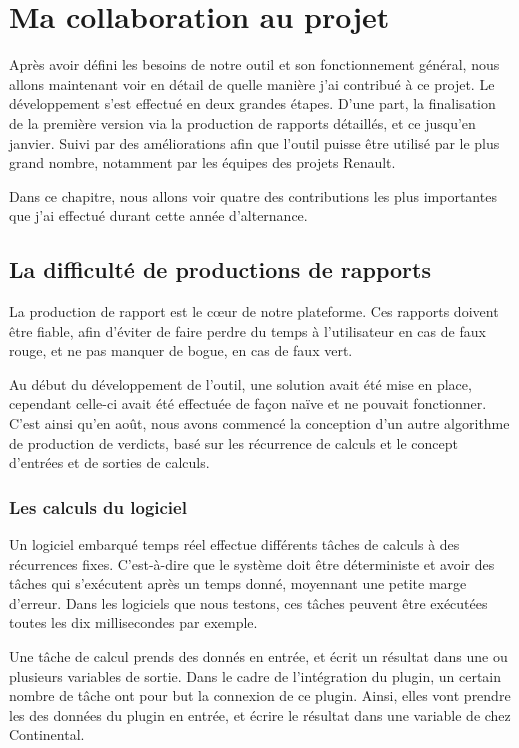 \chapter{Ma collaboration au projet}\label{collab}
\putminitoc
Après avoir défini les besoins de notre outil et son fonctionnement général, nous allons maintenant voir en détail de quelle manière j'ai contribué à ce projet. Le développement s'est effectué en deux grandes étapes. D'une part, la finalisation de la première version via la production de rapports détaillés, et ce jusqu'en janvier. Suivi par des améliorations afin que l'outil puisse être utilisé par le plus grand nombre, notamment par les équipes des projets Renault. 

Dans ce chapitre, nous allons voir quatre des contributions les plus importantes que j'ai effectué durant cette année d'alternance.

\section{La difficulté de productions de rapports}
La production de rapport est le cœur de notre plateforme. Ces rapports doivent être fiable, afin d'éviter de faire perdre du temps à l'utilisateur en cas de faux rouge, et ne pas manquer de bogue, en cas de faux vert. 

Au début du développement de l'outil, une solution avait été mise en place, cependant celle-ci avait été effectuée de façon naïve et ne pouvait fonctionner. C'est ainsi qu'en août, nous avons commencé la conception d'un autre algorithme de production de verdicts, basé sur les récurrence de calculs et le concept d'entrées et de sorties de calculs. 

\subsection{Les calculs du logiciel}
	Un logiciel embarqué temps réel effectue différents tâches de calculs à des récurrences fixes. C'est-à-dire que le système doit être déterministe et avoir des tâches qui s'exécutent après un temps donné, moyennant une petite marge d'erreur. Dans les logiciels que nous testons, ces tâches peuvent être exécutées toutes les dix millisecondes par exemple. 
	
	Une tâche de calcul prends des donnés en entrée, et écrit un résultat dans une ou plusieurs variables de sortie. Dans le cadre de l'intégration du plugin, un certain nombre de tâche ont pour but la connexion de ce plugin. Ainsi, elles vont prendre les des données du plugin en entrée, et écrire le résultat dans une variable de chez Continental. 

